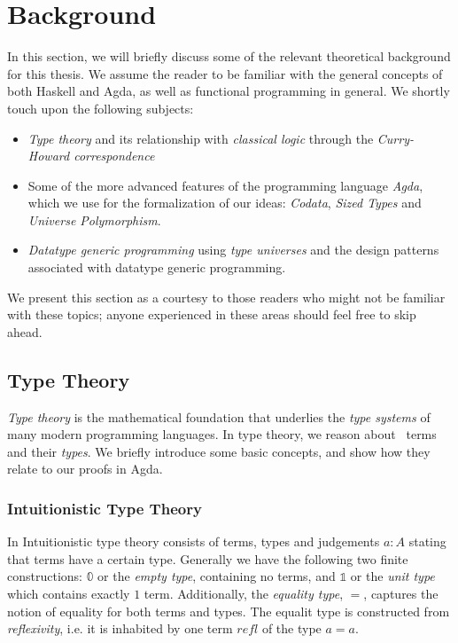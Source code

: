 \documentclass[a4paper,msc,twosized=semi]{uustthesis}
\begin{document}
\chapter{Background}
In this section, we will briefly discuss some of the relevant theoretical background 
for this thesis. We assume the reader to be familiar with the general concepts of both 
Haskell and Agda, as well as functional programming in general. We shortly touch upon 
the following subjects:

\begin{itemize}
  \item
  \emph{Type theory} and its relationship with \emph{classical logic} through the 
  \emph{Curry-Howard correspondence}

  \item 
  Some of the more advanced features of the programming language \emph{Agda}, which we 
  use for the formalization of our ideas: \emph{Codata}, \emph{Sized Types} and \emph
  {Universe Polymorphism}. 

  \item 
  \emph{Datatype generic programming} using \emph{type universes} and the design 
  patterns associated with datatype generic programming.  
\end{itemize}

  We present this section as a courtesy to those readers who might not be familiar 
  with these topics; anyone experienced in these areas should feel free to skip ahead. 

\section{Type Theory}

  \emph{Type theory} is the mathematical foundation that underlies the \emph{type 
  systems} of many modern programming languages. In type theory, we reason about \emph\
  {terms} and their \emph{types}. We briefly introduce some basic concepts, and show 
  how they relate to our proofs in Agda. 

  \subsection{Intuitionistic Type Theory}

  In Intuitionistic type theory consists of terms, types and judgements $a : A$ 
  stating that terms have a certain type. Generally we have the following two finite 
  constructions: $\mathbb{0}$ or the \emph{empty type}, containing no terms, and 
  $\mathbb{1}$ or the \emph{unit type} which contains exactly $1$ term. Additionally,
  the \emph{equality type}, $=$, captures the notion of equality for both terms and 
  types. The equalit type is constructed from \emph{reflexivity}, i.e. it is 
  inhabited by one term $refl$ of the type $a = a$. 
\end{document}
